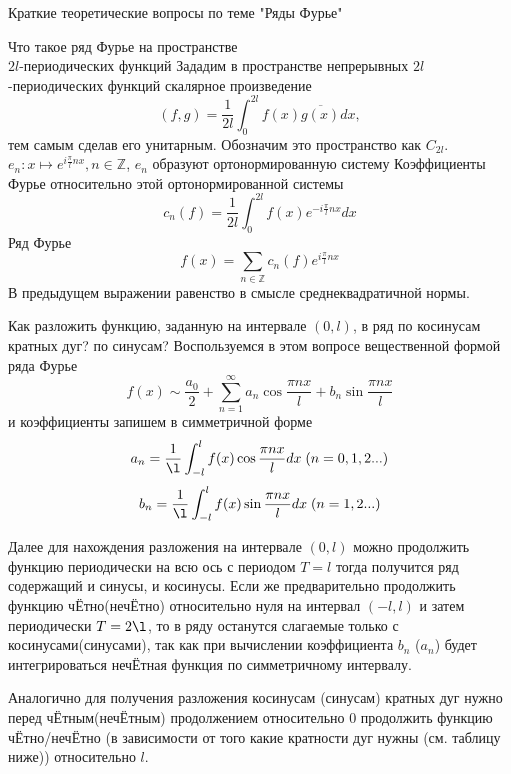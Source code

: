 \documentclass{article}
\begin{document}
\begin{section}{Краткие теоретические вопросы по теме "Ряды Фурье"}
\begin{subsection}{Что такое ряд Фурье на пространстве\\$2l$-периодических функций}
Зададим в пространстве непрерывных $2l$-периодических функций скалярное произведение
\[(f, g) = \frac{1}{2l}\int_0^{2l}f(x)\overline{g(x)}dx,\]
тем самым сделав его унитарным. Обозначим это пространство как $C_{2l}$.\\

$e_n: x \mapsto e^{i\frac{\pi}{l}nx}, n \in \mathbb{Z}$, $e_n$ образуют ортонормированную систему
Коэффициенты Фурье относительно этой ортонормированной системы
\[c_n(f) = \frac{1}{2l} \int_0^{2l}f(x)e^{-i\frac{\pi}{l}nx}dx\]
Ряд Фурье 
\[f(x) = \sum_{n \in \mathbb{Z}} c_n(f)e^{i\frac{\pi}{l}nx}\]
В предыдущем выражении равенство в смысле среднеквадратичной нормы.
\end{subsection}


\begin{subsection}{Как разложить функцию, заданную на интервале $(0, l)$, в ряд по косинусам кратных дуг? по синусам?}
Воспользуемся в этом вопросе вещественной формой ряда Фурье
\[f(x) \sim \frac{a_0}{2}+\sum_{n=1}^{\infty}a_n \cos \frac{\pi nx}{l} +b_n \sin \frac{\pi nx}{l}\]
и коэффициенты запишем в симметричной форме
\[a_n = \frac{1}{\l}\int_{-l}^l f(x)\cos \frac{\pi nx}{l} dx\; (n = 0, 1, 2 ...)\]
\[b_n = \frac{1}{\l}\int_{-l}^l f(x)\sin \frac{\pi nx}{l} dx\; (n = 1, 2 ...)\]

Далее для нахождения разложения на интервале $(0, l)$ можно продолжить функцию периодически на всю ось с периодом $T = l$ тогда получится ряд содержащий и синусы, и косинусы. Если же предварительно продолжить функцию ч{\footnotesize Ё}тно(неч{\footnotesize Ё}тно) относительно нуля на интервал $ (-l, l) $ и затем периодически $T = 2\l$, то в ряду останутся слагаемые только с косинусами(синусами), так как при вычислении коэффициента $ b_n $ ($a_n$) будет интегрироваться неч{\footnotesize Ё}тная функция по симметричному интервалу.

Аналогично для получения разложения косинусам (синусам) кратных дуг нужно перед ч{\footnotesize Ё}тным(неч{\footnotesize Ё}тным) продолжением относительно 0 продолжить функцию ч{\footnotesize Ё}тно/неч{\footnotesize Ё}тно (в зависимости от того какие кратности дуг нужны (см. таблицу ниже)) относительно $l$.


\end{subsection}
\end{section}
\end{document}
